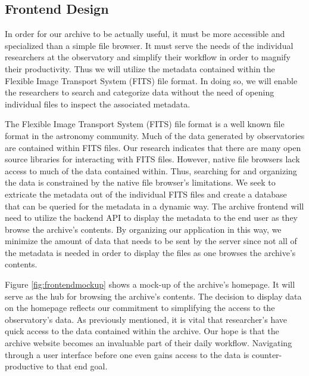 \documentclass[12pt]{report}
\begin{document}
\subsection*{Frontend Design}

In order for our archive to be actually useful, it must be more accessible and specialized than a simple file browser. It must serve the needs of the individual researchers at the observatory and simplify their workflow in order to magnify their productivity. Thus we will utilize the metadata contained within the Flexible Image Transport System (FITS) file format. In doing so, we will enable the researchers to search and categorize data without the need of opening individual files to inspect the associated metadata.

The Flexible Image Transport System (FITS) file format is a well known file format in the astronomy community. Much of the data generated by observatories are contained within FITS files. Our research indicates that there are many open source libraries for interacting with FITS files. However, native file browsers lack access to much of the data contained within. Thus, searching for and organizing the data is constrained by the native file browser's limitations. We seek to extricate the metadata out of the individual FITS files and create a database that can be queried for the metadata in a dynamic way. The archive frontend will need to utilize the backend API to display the metadata to the end user as they browse the archive's contents. By organizing our application in this way, we minimize the amount of data that needs to be sent by the server since not all of the metadata is needed in order to display the files as one browses the archive's contents.

Figure \ref{fig:frontendmockup} shows a mock-up of the archive's homepage. It will serve as the hub for browsing the archive's contents. The decision to display data on the homepage reflects our commitment to simplifying the access to the observatory's data. As previously mentioned, it is vital that researcher's have quick access to the data contained within the archive. Our hope is that the archive website becomes an invaluable part of their daily workflow. Navigating through a user interface before one even gains access to the data is counter-productive to that end goal.
\end{document}
